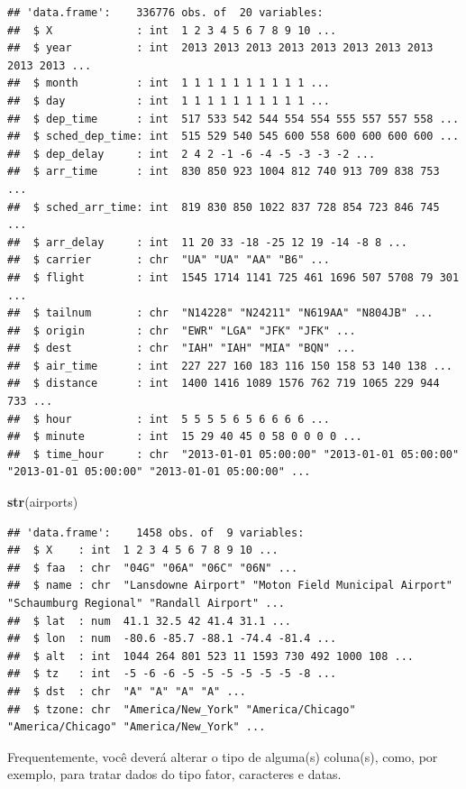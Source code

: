 \documentclass[
]{book}
\newenvironment{Shaded}{\begin{snugshade}}{\end{snugshade}}
\newcommand{\FunctionTok}[1]{\textcolor[rgb]{0.13,0.29,0.53}{\textbf{#1}}}
\newcommand{\NormalTok}[1]{#1}
\begin{document}
\begin{verbatim}
## 'data.frame':    336776 obs. of  20 variables:
##  $ X             : int  1 2 3 4 5 6 7 8 9 10 ...
##  $ year          : int  2013 2013 2013 2013 2013 2013 2013 2013 2013 2013 ...
##  $ month         : int  1 1 1 1 1 1 1 1 1 1 ...
##  $ day           : int  1 1 1 1 1 1 1 1 1 1 ...
##  $ dep_time      : int  517 533 542 544 554 554 555 557 557 558 ...
##  $ sched_dep_time: int  515 529 540 545 600 558 600 600 600 600 ...
##  $ dep_delay     : int  2 4 2 -1 -6 -4 -5 -3 -3 -2 ...
##  $ arr_time      : int  830 850 923 1004 812 740 913 709 838 753 ...
##  $ sched_arr_time: int  819 830 850 1022 837 728 854 723 846 745 ...
##  $ arr_delay     : int  11 20 33 -18 -25 12 19 -14 -8 8 ...
##  $ carrier       : chr  "UA" "UA" "AA" "B6" ...
##  $ flight        : int  1545 1714 1141 725 461 1696 507 5708 79 301 ...
##  $ tailnum       : chr  "N14228" "N24211" "N619AA" "N804JB" ...
##  $ origin        : chr  "EWR" "LGA" "JFK" "JFK" ...
##  $ dest          : chr  "IAH" "IAH" "MIA" "BQN" ...
##  $ air_time      : int  227 227 160 183 116 150 158 53 140 138 ...
##  $ distance      : int  1400 1416 1089 1576 762 719 1065 229 944 733 ...
##  $ hour          : int  5 5 5 5 6 5 6 6 6 6 ...
##  $ minute        : int  15 29 40 45 0 58 0 0 0 0 ...
##  $ time_hour     : chr  "2013-01-01 05:00:00" "2013-01-01 05:00:00" "2013-01-01 05:00:00" "2013-01-01 05:00:00" ...
\end{verbatim}

\begin{Shaded}
\begin{Highlighting}[]
\FunctionTok{str}\NormalTok{(airports)}
\end{Highlighting}
\end{Shaded}

\begin{verbatim}
## 'data.frame':    1458 obs. of  9 variables:
##  $ X    : int  1 2 3 4 5 6 7 8 9 10 ...
##  $ faa  : chr  "04G" "06A" "06C" "06N" ...
##  $ name : chr  "Lansdowne Airport" "Moton Field Municipal Airport" "Schaumburg Regional" "Randall Airport" ...
##  $ lat  : num  41.1 32.5 42 41.4 31.1 ...
##  $ lon  : num  -80.6 -85.7 -88.1 -74.4 -81.4 ...
##  $ alt  : int  1044 264 801 523 11 1593 730 492 1000 108 ...
##  $ tz   : int  -5 -6 -6 -5 -5 -5 -5 -5 -5 -8 ...
##  $ dst  : chr  "A" "A" "A" "A" ...
##  $ tzone: chr  "America/New_York" "America/Chicago" "America/Chicago" "America/New_York" ...
\end{verbatim}

Frequentemente, você deverá alterar o tipo de alguma(s) coluna(s), como, por exemplo, para tratar dados do tipo fator, caracteres e datas.
\end{document}
